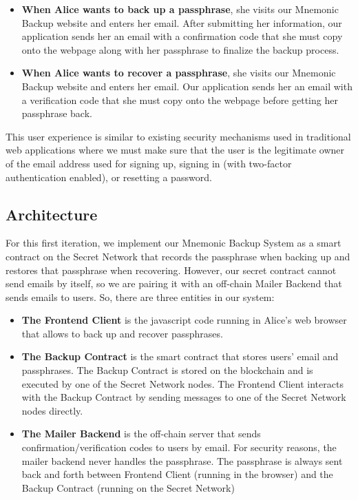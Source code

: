 \documentclass[runningheads]{llncs}
\begin{document}
\begin{itemize}
    \item {\bf When Alice wants to back up a passphrase}, she visits our Mnemonic Backup website and enters her email. After submitting her information, our application sends her an email with a confirmation code that she must copy onto the webpage along with her passphrase to finalize the backup process. 
    \item {\bf When Alice wants to recover a passphrase}, she visits our Mnemonic Backup website and enters her email. Our application sends her an email with a verification code that she must copy onto the webpage before getting her passphrase back. 
\end{itemize}

This user experience is similar to existing security mechanisms used in traditional web applications where we must make sure that the user is the legitimate owner of the email address used for signing up, signing in (with two-factor authentication enabled), or resetting a password.

\subsection{Architecture}

For this first iteration, we implement our Mnemonic Backup System as a smart contract on the Secret Network that records the passphrase when backing up and restores that passphrase when recovering. However, our secret contract cannot send emails by itself, so we are pairing it with an off-chain Mailer Backend that sends emails to users. So, there are three entities in our system:

\begin{itemize}
    \item {\bf The Frontend Client} is the javascript code running in Alice's web browser that allows to back up and recover passphrases.
    \item {\bf The Backup Contract} is the smart contract that stores users' email and passphrases. The Backup Contract is stored on the blockchain and is executed by one of the Secret Network nodes. The Frontend Client interacts with the Backup Contract by sending messages to one of the Secret Network nodes directly.
    \item {\bf The Mailer Backend} is the off-chain server that sends confirmation/verification codes to users by email. For security reasons, the mailer backend never handles the passphrase. The passphrase is always sent back and forth between Frontend Client (running in the browser) and the Backup Contract (running on the Secret Network)
\end{itemize}
\end{document}
